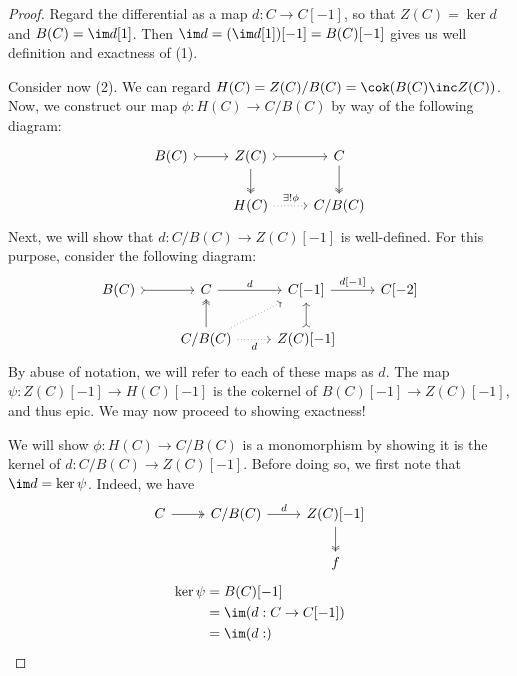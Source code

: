 \documentclass[12pt]{amsart}
\theoremstyle{definition}
\begin{document}
\begin{proof}
  Regard the differential as a map $d:C\to C[-1]$, so that $Z(C)=\ker d$ and $B(C)= \im d[1]$.
  Then $\im d=(\im d[1])[-1]=B(C)[-1]$ gives us well definition and exactness of (1).

  Consider now (2).
  We can regard $H(C)=Z(C)/B(C)=\cok (B(C)\inc Z(C))$.
  Now, we construct our map $\phi:H(C)\to C/B(C)$ by way of the following diagram:
  \[
    \begin{tikzcd}
      B(C)\ar[r,tail] & Z(C)\ar[r,tail]\ar[d,twoheadrightarrow] & C\ar[d,twoheadrightarrow] \\
                      & H(C) \ar[r, dotted, "\exists!\phi"] & C/B(C)
    \end{tikzcd}
  \] 
  Next, we will show that $d:C/B(C)\to Z(C)[-1]$ is well-defined.
  For this purpose, consider the following diagram:
  \[
    \begin{tikzcd}
      B(C)\ar[r,tail] & C\ar[r,"d"] & C[-1]\ar[r,"d{[-1]}"] & C[-2] \\
                      & C/B(C)\ar[u,twoheadrightarrow] \ar[ur,dotted]\ar[r,dotted,"d"'] & Z(C)[-1]\ar[u,tail]
    \end{tikzcd}
  \] 
  By abuse of notation, we will refer to each of these maps as $d$.
  The map $\psi:Z(C)[-1]\to H(C)[-1]$ is the cokernel of $B(C)[-1]\to Z(C)[-1]$, and thus epic.
  We may now proceed to showing exactness!

  We will show $\phi:H(C)\to C/B(C)$ is a monomorphism by showing it is the kernel of $d:C/B(C)\to Z(C)[-1]$.
  Before doing so, we first note that $\im d=\ker \psi$.
  Indeed, we have
  \[
    \begin{tikzcd}
      C\ar[r,twoheadrightarrow] & C/B(C)\ar[r,"d"] & Z(C)[-1]\ar[d,twoheadrightarrow] \\
                                && f
    \end{tikzcd}
  \] 
  \begin{align*}
    \ker \psi
      &= B(C)[-1] \\
      &= \im (d:C\to C[-1]) \\
      &= \im (d:)
  \end{align*}
\end{proof}
\end{document}
